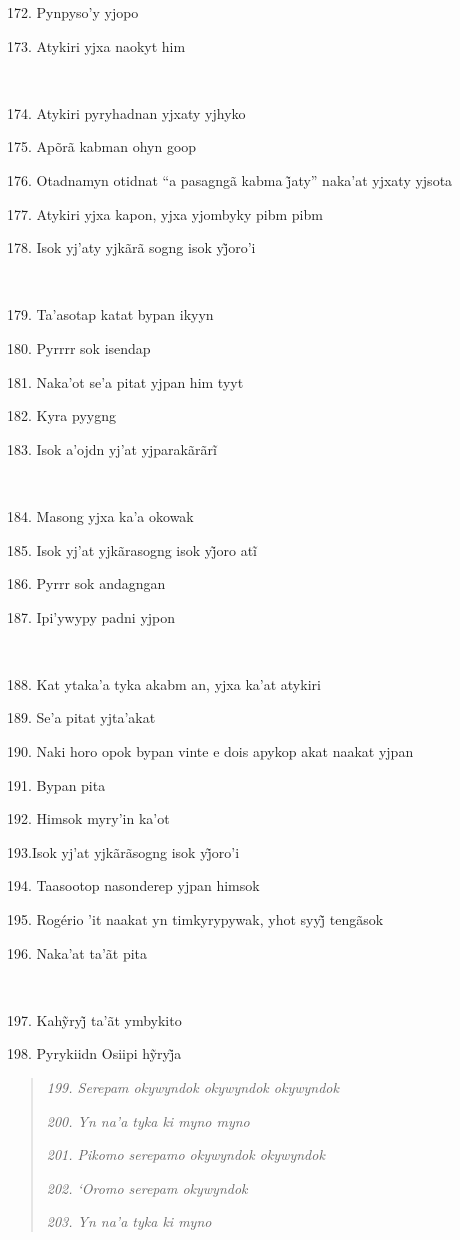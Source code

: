 172. Pynpyso'y yjopo

173. Atykiri yjxa naokyt him

~

174. Atykiri pyryhadnan yjxaty yjhyko

175. Apõrã kabman ohyn goop

176. Otadnamyn otidnat ``a pasagngã kabma j̃aty'' naka’at yjxaty yjsota

177. Atykiri yjxa kapon, yjxa yjombyky pibm pibm

178. Isok yj’aty yjkãrã sogng isok yj̃oro’i

~

179. Ta'asotap katat bypan ikyyn

180. Pyrrrr sok isendap

181. Naka'ot se'a pitat yjpan him tyyt

182. Kyra pyygng

183. Isok a’ojdn yj’at yjparakãrãrĩ

~

184. Masong yjxa ka'a okowak

185. Isok yj’at yjkãrasogng isok yj̃oro atĩ

186. Pyrrr sok andagngan

187. Ipi'ywypy padni yjpon

~

188. Kat ytaka'a tyka akabm an, yjxa ka'at atykiri

189. Se'a pitat yjta'akat

190. Naki horo opok bypan vinte e dois apykop akat naakat yjpan

191. Bypan pita

192. Himsok myry'in ka'ot

193.Isok yj’at yjkãrãsogng isok yj̃oro’i

194. Taasootop nasonderep yjpan himsok

195. Rogério ’it naakat yn timkyrypywak, yhot syyj̃ tengãsok

196. Naka'at ta'ãt pita

~

197. Kahỹryj̃ ta’ãt ymbykito

198. Pyrykiidn Osiipi hỹryj̃a

\begin{quote}
\forceindent\emph{199. Serepam okywyndok okywyndok okywyndok}

\emph{200. Yn na'a tyka ki myno myno}

\emph{201. Pikomo serepamo okywyndok okywyndok}

\emph{202. `Oromo serepam okywyndok}

\emph{203. Yn na'a tyka ki myno}
\end{quote}

